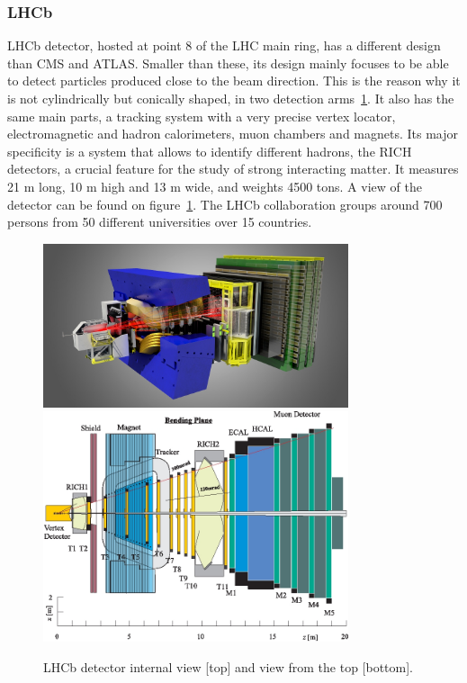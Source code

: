 \subsubsection{LHCb}
\label{sec:lhcb}

LHCb detector, hosted at point 8 of the LHC main ring, has a different design than CMS and ATLAS. Smaller than these, its design mainly focuses to be able to detect particles produced close to the beam direction. This is the reason why it is not cylindrically but conically shaped, in two detection arms~\ref{fig:lhcbdet}. It also has the same main parts, a tracking system with a very precise vertex locator, electromagnetic and hadron calorimeters, muon chambers and magnets. Its major specificity is a system that allows to identify different hadrons, the RICH detectors, a crucial feature for the study of strong interacting matter. It measures 21 m long, 10 m high and 13 m wide, and weights 4500 tons. A view of the detector can be found on figure~\ref{fig:lhcbdet}. The LHCb collaboration groups around 700 persons from 50 different universities over 15 countries. 

\begin{figure}[!Hhtbp]
  \begin{center}
    \includegraphics[width=0.8\textwidth]{figs/LHCbDetectorlight1.jpg}
    \includegraphics[width=0.8\textwidth]{figs/LHCb_UpView.jpg}
    \caption{LHCb detector internal view [top] and view from the top [bottom]. }
    \label{fig:lhcbdet}
  \end{center}
\end{figure}

